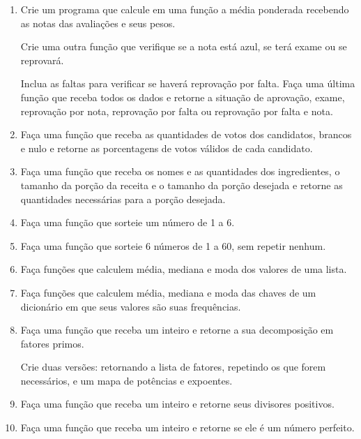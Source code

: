 \begin{enumerate}

	\item Crie um programa que calcule em uma função a média ponderada recebendo as notas das avaliações e seus pesos.	
	
	Crie uma outra função que verifique se a nota está azul, se terá exame ou se reprovará.
	
	Inclua as faltas para verificar se haverá reprovação por falta.
	Faça uma última função que receba todos os dados e retorne a situação de aprovação, exame, reprovação por nota, reprovação por falta ou reprovação por falta e nota. 
	
	\item Faça uma função que receba as quantidades de votos dos candidatos, brancos e nulo e retorne as porcentagens de votos válidos de cada candidato.
	
	\item Faça uma função que receba os nomes e as quantidades dos ingredientes, o tamanho da porção da receita e o tamanho da porção desejada e retorne as quantidades necessárias para a porção desejada.
	
	\item Faça uma função que sorteie um número de 1 a 6.
	
	\item Faça uma função que sorteie 6 números de 1 a 60, sem repetir nenhum.
	
	\item Faça funções que calculem média, mediana e moda dos valores de uma lista.
	
	\item Faça funções que calculem média, mediana e moda das chaves de um dicionário em que seus valores são suas frequências.


	\item Faça uma função que receba um inteiro e retorne a sua decomposição em fatores primos.
	
	Crie duas versões: retornando a lista de fatores, repetindo os que forem necessários, e um mapa de potências e expoentes.


	\item Faça uma função que receba um inteiro e retorne seus divisores positivos.


	\item Faça uma função que receba um inteiro e retorne se ele é um número perfeito. 


\end{enumerate}
